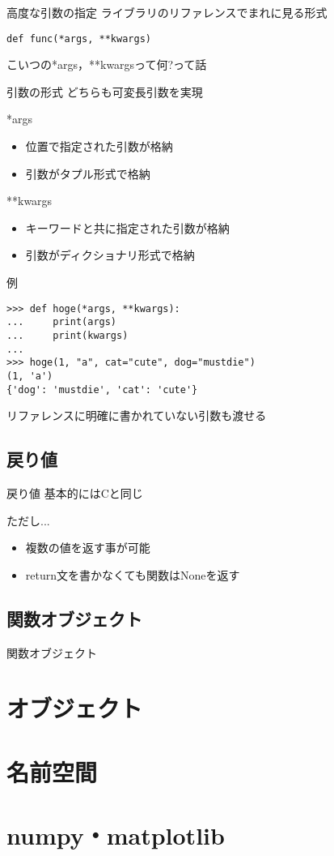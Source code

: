 \documentclass[12pt, xetex, xcolor=pdftex, dvipsnames]{beamer}
\begin{document}
\begin{frame}[fragile]{高度な引数の指定}
ライブラリのリファレンスでまれに見る形式

\begin{lstlisting}
def func(*args, **kwargs)
\end{lstlisting}

こいつの*args，**kwargsって何?って話
\end{frame}
\begin{frame}{引数の形式}
    どちらも\alert{可変長引数}を実現

    \begin{block}{*args}
        \begin{itemize}
            \item 位置で指定された引数が格納
            \item 引数がタプル形式で格納
        \end{itemize}
    \end{block}
    \begin{block}{**kwargs}
        \begin{itemize}
            \item キーワードと共に指定された引数が格納
            \item 引数がディクショナリ形式で格納
        \end{itemize}
    \end{block}
\end{frame}
\begin{frame}[fragile]{例}
\begin{lstlisting}
>>> def hoge(*args, **kwargs):
...     print(args)
...     print(kwargs)
...
>>> hoge(1, "a", cat="cute", dog="mustdie")
(1, 'a')
{'dog': 'mustdie', 'cat': 'cute'}
\end{lstlisting}
\pause

リファレンスに明確に書かれていない引数も渡せる
\end{frame}
\subsection{戻り値}
\begin{frame}{戻り値}
    基本的にはCと同じ

    ただし...
    \begin{itemize}
        \item 複数の値を返す事が可能
        \item return文を書かなくても関数はNoneを返す
    \end{itemize}
\end{frame}
\subsection{関数オブジェクト}
\begin{frame}{関数オブジェクト}

\end{frame}
\section{オブジェクト}

\section{名前空間}

\section{numpy・matplotlib}
\end{document}
